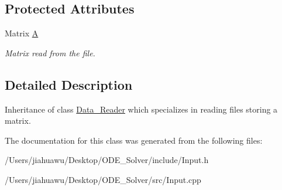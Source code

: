 \subsection*{Protected Attributes}
\begin{DoxyCompactItemize}
\item 
\mbox{\label{class_matrix___reader_a4a8f9b95e6361b1a58a53a3e54c0b0bb}} 
Matrix \mbox{\hyperlink{class_matrix___reader_a4a8f9b95e6361b1a58a53a3e54c0b0bb}{A}}
\begin{DoxyCompactList}\small\item\em Matrix read from the file. \end{DoxyCompactList}\end{DoxyCompactItemize}


\subsection{Detailed Description}
Inheritance of class \mbox{\hyperlink{class_data___reader}{Data\+\_\+\+Reader}} which specializes in reading files storing a matrix. 

The documentation for this class was generated from the following files\+:\begin{DoxyCompactItemize}
\item 
/\+Users/jiahuawu/\+Desktop/\+O\+D\+E\+\_\+\+Solver/include/Input.\+h\item 
/\+Users/jiahuawu/\+Desktop/\+O\+D\+E\+\_\+\+Solver/src/Input.\+cpp\end{DoxyCompactItemize}
